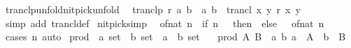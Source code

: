 \begin{isabellebody}
\endisatagproof
{\isafoldproof}%
%
\isadelimproof
\isanewline
%
\endisadelimproof
\isanewline
{}\isamarkupfalse%
\ tranclp{\isacharunderscore}{\kern0pt}unfold{\isacharbrackleft}{\kern0pt}nitpick{\isacharunderscore}{\kern0pt}unfold{\isacharbrackright}{\kern0pt}{\isacharcolon}{\kern0pt}\isanewline
\ \ {\isachardoublequoteopen}tranclp\ r\ a\ b\ {\isasymequiv}\ {\isacharparenleft}{\kern0pt}a{\isacharcomma}{\kern0pt}\ b{\isacharparenright}{\kern0pt}\ {\isasymin}\ trancl\ {\isacharbraceleft}{\kern0pt}{\isacharparenleft}{\kern0pt}x{\isacharcomma}{\kern0pt}\ y{\isacharparenright}{\kern0pt}{\isachardot}{\kern0pt}\ r\ x\ y{\isacharbraceright}{\kern0pt}{\isachardoublequoteclose}\isanewline
%
\isadelimproof
\ \ %
\endisadelimproof
%
\isatagproof
{}\isamarkupfalse%
\ {\isacharparenleft}{\kern0pt}simp\ add{\isacharcolon}{\kern0pt}\ trancl{\isacharunderscore}{\kern0pt}def{\isacharparenright}{\kern0pt}%
\endisatagproof
{\isafoldproof}%
%
\isadelimproof
\isanewline
%
\endisadelimproof
\isanewline
{}\isamarkupfalse%
\ {\isacharbrackleft}{\kern0pt}nitpick{\isacharunderscore}{\kern0pt}simp{\isacharbrackright}{\kern0pt}{\isacharcolon}{\kern0pt}\isanewline
\ \ {\isachardoublequoteopen}of{\isacharunderscore}{\kern0pt}nat\ n\ {\isacharequal}{\kern0pt}\ {\isacharparenleft}{\kern0pt}if\ n\ {\isacharequal}{\kern0pt}\ {}\ then\ {}\ else\ {}\ {\isacharplus}{\kern0pt}\ of{\isacharunderscore}{\kern0pt}nat\ {\isacharparenleft}{\kern0pt}n\ {\isacharminus}{\kern0pt}\ {}{\isacharparenright}{\kern0pt}{\isacharparenright}{\kern0pt}{\isachardoublequoteclose}\isanewline
%
\isadelimproof
\ \ %
\endisadelimproof
%
\isatagproof
{}\isamarkupfalse%
\ {\isacharparenleft}{\kern0pt}cases\ n{\isacharparenright}{\kern0pt}\ auto%
\endisatagproof
{\isafoldproof}%
%
\isadelimproof
\isanewline
%
\endisadelimproof
\isanewline
{}\isamarkupfalse%
\ prod\ {\isacharcolon}{\kern0pt}{\isacharcolon}{\kern0pt}\ {\isachardoublequoteopen}{\isacharprime}{\kern0pt}a\ set\ {\isasymRightarrow}\ {\isacharprime}{\kern0pt}b\ set\ {\isasymRightarrow}\ {\isacharparenleft}{\kern0pt}{\isacharprime}{\kern0pt}a\ {\isasymtimes}\ {\isacharprime}{\kern0pt}b{\isacharparenright}{\kern0pt}\ set{\isachardoublequoteclose}\ \isanewline
\ \ {\isachardoublequoteopen}prod\ A\ B\ {\isacharequal}{\kern0pt}\ {\isacharbraceleft}{\kern0pt}{\isacharparenleft}{\kern0pt}a{\isacharcomma}{\kern0pt}\ b{\isacharparenright}{\kern0pt}{\isachardot}{\kern0pt}\ a\ {\isasymin}\ A\ {\isasymand}\ b\ {\isasymin}\ B{\isacharbraceright}{\kern0pt}{\isachardoublequoteclose}\isanewline

\end{isabellebody}
